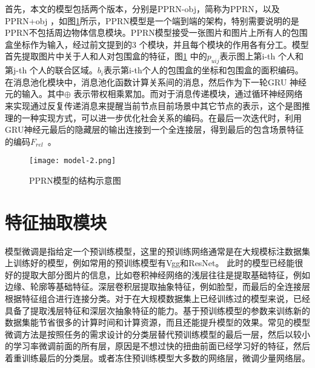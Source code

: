 首先，本文的模型包括两个版本，分别是PPRN-obj，简称为PPRN，以及PPRN+obj ，如图\ref{fig:model-pprn}所示，PPRN模型是一个端到端的架构，特别需要说明的是PPRN不包括周边物体信息模块。PPRN模型接受一张图片和图片上所有人的包围盒坐标作为输入，经过前文提到的3 个模块，并且每个模块的作用各有分工。模型首先提取图片中关于人和人对包围盒的特征，图\ref{fig:model-pprn} 中的$p_{uij}$表示图上第i-th 个人和第j-th 个人的联合区域。$b_{i}$表示第i-th个人的包围盒的坐标和包围盒的面积编码。在消息池化模块中，消息池化函数计算关系间的消息，然后作为下一轮GRU 神经元的输入。其中$\oplus$ 表示带权相乘累加。而对于消息传递模块，通过循环神经网络来实现通过反复传递消息来提醒当前节点目前场景中其它节点的表示，这个是图推理的一种实现方式，可以进一步优化社会关系的编码。在最后一次迭代时，利用GRU神经元最后的隐藏层的输出连接到一个全连接层，得到最后的包含场景特征的编码$F_{rel}$~。
\begin{figure}[htpb]
	\centering
	\texttt{[image: model-2.png]}
    \caption{PPRN模型的结构示意图}
	\vspace*{-3.5mm}
	\label{fig:model-pprn}
\end{figure}

\section{特征抽取模块}


模型微调是指给定一个预训练模型，这里的预训练网络通常是在大规模标注数据集上训练好的模型，例如常用的预训练模型有Vgg和ResNet。 此时的模型已经能很好的提取大部分图片的信息，比如卷积神经网络的浅层往往是提取基础特征，例如边缘、轮廓等基础特征。深层卷积层提取抽象特征，例如脸型，而最后的全连接层根据特征组合进行连接分类。对于在大规模数据集上已经训练过的模型来说，已经具备了提取浅层特征和深层次抽象特征的能力。基于预训练模型的参数来训练新的数据集能节省很多的计算时间和计算资源，而且还能提升模型的效果。常见的模型微调方法是按照任务的需求设计的分类层替代预训练模型的最后一层，然后以较小的学习率微调前面的所有层，原因是不想过快的扭曲前面已经学习好的特征，然后着重训练最后的分类层。或者冻住预训练模型大多数的网络层，微调少量网络层。

